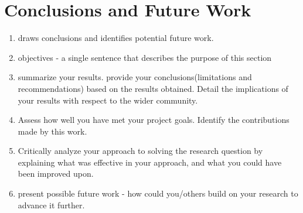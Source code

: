 \chapter{Conclusions and Future Work}

\begin{enumerate}
    \item draws conclusions and identifies potential future work.
    \item objectives - a single sentence that describes the purpose of this section 
    \item summarize your results. provide your conclusions(limitations and recommendations) based on the results obtained. Detail the implications of your results with respect to the wider community.
    \item Assess how well you have met your project goals. Identify the contributions made by this work.
    \item Critically analyze your approach to solving the research question by explaining what was effective in your approach, and what you could have been improved upon.
    \item present possible future work - how could you/others build on your research to advance it further.
\end{enumerate}